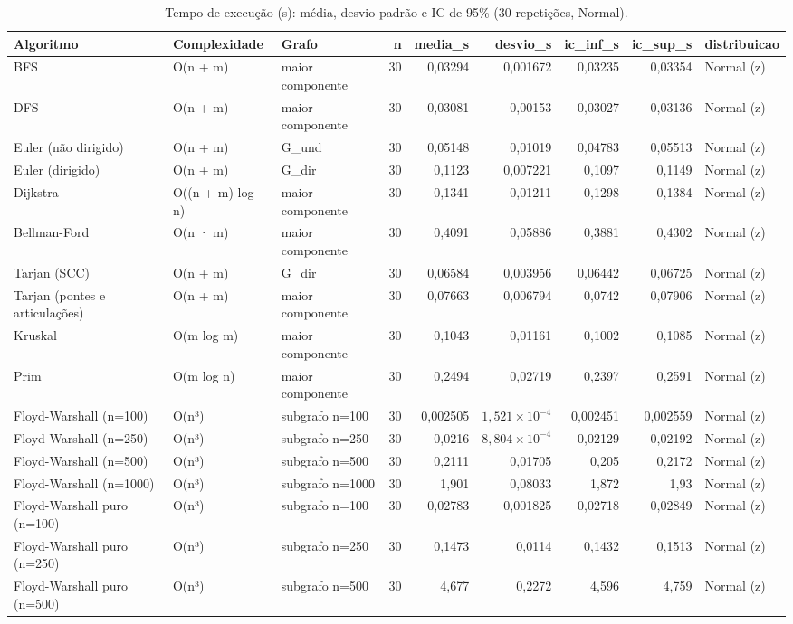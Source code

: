 \begin{table}[htbp]
\centering
\small
\caption{Tempo de execução (s): média, desvio padrão e IC de 95\% (30 repetições, Normal).}
\label{tab:04_tempos_execucao}
\begin{tabular}{lllrrrrrl}
\toprule
Algoritmo & Complexidade & Grafo & n & media\_s & desvio\_s & ic\_inf\_s & ic\_sup\_s & distribuicao \\
\midrule
BFS & O(n + m) & maior componente & 30 & 0,03294 & 0,001672 & 0,03235 & 0,03354 & Normal (z) \\
DFS & O(n + m) & maior componente & 30 & 0,03081 & 0,00153 & 0,03027 & 0,03136 & Normal (z) \\
Euler (não dirigido) & O(n + m) & G\_und & 30 & 0,05148 & 0,01019 & 0,04783 & 0,05513 & Normal (z) \\
Euler (dirigido) & O(n + m) & G\_dir & 30 & 0,1123 & 0,007221 & 0,1097 & 0,1149 & Normal (z) \\
Dijkstra & O((n + m) log n) & maior componente & 30 & 0,1341 & 0,01211 & 0,1298 & 0,1384 & Normal (z) \\
Bellman-Ford & O(n · m) & maior componente & 30 & 0,4091 & 0,05886 & 0,3881 & 0,4302 & Normal (z) \\
Tarjan (SCC) & O(n + m) & G\_dir & 30 & 0,06584 & 0,003956 & 0,06442 & 0,06725 & Normal (z) \\
Tarjan (pontes e articulações) & O(n + m) & maior componente & 30 & 0,07663 & 0,006794 & 0,0742 & 0,07906 & Normal (z) \\
Kruskal & O(m log m) & maior componente & 30 & 0,1043 & 0,01161 & 0,1002 & 0,1085 & Normal (z) \\
Prim & O(m log n) & maior componente & 30 & 0,2494 & 0,02719 & 0,2397 & 0,2591 & Normal (z) \\
Floyd-Warshall (n=100) & O(n³) & subgrafo n=100 & 30 & 0,002505 & $1,521 \times 10^{-4}$ & 0,002451 & 0,002559 & Normal (z) \\
Floyd-Warshall (n=250) & O(n³) & subgrafo n=250 & 30 & 0,0216 & $8,804 \times 10^{-4}$ & 0,02129 & 0,02192 & Normal (z) \\
Floyd-Warshall (n=500) & O(n³) & subgrafo n=500 & 30 & 0,2111 & 0,01705 & 0,205 & 0,2172 & Normal (z) \\
Floyd-Warshall (n=1000) & O(n³) & subgrafo n=1000 & 30 & 1,901 & 0,08033 & 1,872 & 1,93 & Normal (z) \\
Floyd-Warshall puro (n=100) & O(n³) & subgrafo n=100 & 30 & 0,02783 & 0,001825 & 0,02718 & 0,02849 & Normal (z) \\
Floyd-Warshall puro (n=250) & O(n³) & subgrafo n=250 & 30 & 0,1473 & 0,0114 & 0,1432 & 0,1513 & Normal (z) \\
Floyd-Warshall puro (n=500) & O(n³) & subgrafo n=500 & 30 & 4,677 & 0,2272 & 4,596 & 4,759 & Normal (z) \\
\bottomrule
\end{tabular}
\end{table}
